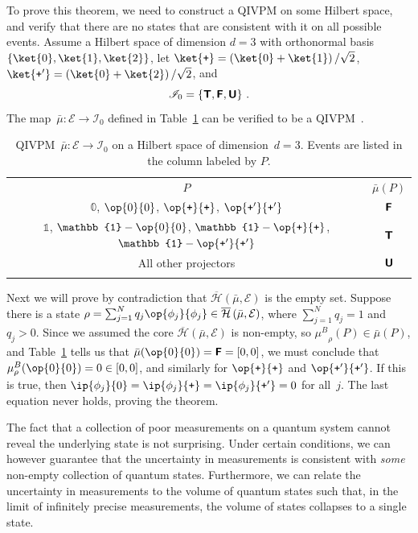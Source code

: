 \documentclass[english,reprint, aps, prl,superscriptaddress, showpacs,
showkeys, longbibliography, amsmath, amssymb, floatfix]{revtex4-1}
\theoremstyle{plain}
\theoremstyle{definition}
\newcommand{\Hilb}{\mathcal{H}}
\newcommand{\events}{\ensuremath{\mathcal{E}}}
\newcommand{\interval}[1]{{\normalfont\textsf{\textbf{#1}}}}
\newcommand{\imposs}{\interval{F}}
\newcommand{\necess}{\interval{T}}
\newcommand{\unknown}{\interval{U}}
\newcommand{\proj}[1]{\op{#1}{#1}}
\newcommand{\ps}{\texttt{+}}
\newcommand{\coreBorn}{\ensuremath{\overline{\Hilb}}}
\newcommand{\muB}{\ensuremath{\mu^{B}}}
\begin{document}
To prove this theorem, we need to construct a QIVPM on some Hilbert
space, and verify that there are no states that are consistent with it
on all possible events. Assume a Hilbert space of dimension $d=3$ with
orthonormal basis $\left\{ \ket{0},\ket{1},\ket{2}\right\} $, let
$\ket{\ps}=\left(\ket{0}+\ket{1}\right)/\sqrt{2}$,
$\ket{\ps'}=\left(\ket{0}+\ket{2}\right)/\sqrt{2}$, and
\begin{equation}
\mathscr{I}_{0}=\left\{ \necess,\imposs,\unknown\right\} \,.\label{eq:3-value-intervals}
\end{equation}
The map~$\bar{\mu}:\events\rightarrow\mathscr{I}_{0}$ defined in
Table~\ref{tab:non-Born-QIVPM} can be verified to be a
QIVPM~\cite{TaiThesis2018}.
\begin{table}
\caption{\label{tab:non-Born-QIVPM}QIVPM~$\bar{\mu}:\events\rightarrow\mathscr{I}_{0}$
on a Hilbert space of dimension~$d=3$. Events are listed in the column
labeled by $P$.}

\begin{tabular}{cc}
\toprule 
\addlinespace
$P$ & $\bar{\mu}\left(P\right)$\tabularnewline\addlinespace
\midrule
\midrule 
\addlinespace
$\mathbb{0}$, $\proj{0}$, $\proj{\ps}$, $\proj{\ps'}$ & $\imposs$\tabularnewline\addlinespace
\midrule 
\addlinespace
$\mathbb{1}$, $\mathbb{1}-\proj{0}$, $\mathbb{1}-\proj{\ps}$, 
$\mathbb{1}-\proj{\ps'}$ & $\necess$\tabularnewline\addlinespace
\midrule 
\addlinespace
All other projectors & $\unknown$\tabularnewline\addlinespace
\bottomrule
\end{tabular}
\end{table}
Next we will prove by contradiction that
$\coreBorn\left(\bar{\mu},\events\right)$ is the empty set. Suppose
there is a state
$\rho=\sum_{j=1}^{N}q_{j}\proj{\phi_{j}}\in\coreBorn\left(\bar{\mu},\events\right)$,
where $\sum_{j=1}^{N}q_{j}=1$ and $q_{j} > 0$. Since
we assumed the core $\coreBorn\left(\bar{\mu},\events\right)$ 
is non-empty, so  $\muB_{\rho}(P)\in\bar{\mu}(P)$, and 
Table~\ref{tab:non-Born-QIVPM} tells us that
$\bar{\mu}(\proj{0})=\imposs=[0,0]$, we must conclude that
$\muB_{\rho}(\proj{0})=0\in[0,0]$, and similarly for $\proj{\ps}$ and $\proj{\ps'}$.
If this is true, then $\ip{\phi_{j}}{0}=\ip{\phi_{j}}{\ps}=\ip{\phi_{j}}{\ps'}=0$
for all~$j$. The last equation never holds, proving the theorem.

The fact that a collection of poor measurements on a quantum system
cannot reveal the underlying state is not surprising. Under certain
conditions, we can however guarantee that the uncertainty in measurements
is consistent with \emph{some} non-empty collection of quantum states.
Furthermore, we can relate the uncertainty in measurements to the
volume of quantum states such that, in the limit of infinitely precise
measurements, the volume of states collapses to a single state.
\end{document}
